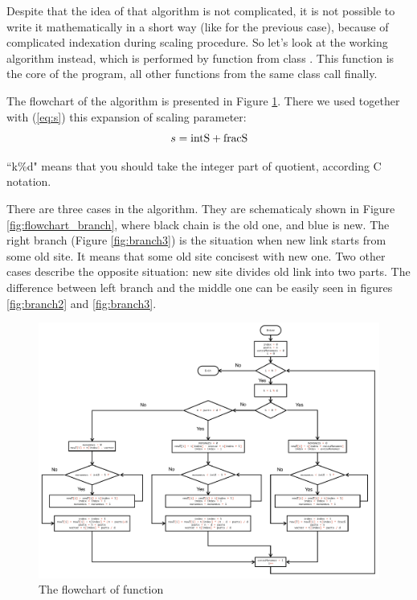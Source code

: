 \documentclass[12pt]{article}
\begin{document}
\begin{mySection}[Algorithm]
Despite that the idea of that algorithm is not complicated, it is not possible to write it mathematically in a short way (like for the previous case), because of complicated indexation during scaling procedure. So let's look at the working algorithm instead, which is performed by function  from class . This function is the core of the program, all other functions from the same class call  finally.

The flowchart of the algorithm is presented in Figure \ref{fig:flowchart}. There we used together with (\ref{eq:s}) this expansion of scaling parameter:
\begin{equation}
s = {\rm intS} +{\rm fracS} 
\end{equation}

``k\%d" means that you should take the integer part of quotient, according C notation.

There are three cases in the algorithm. They are schematicaly shown in Figure \ref{fig:flowchart_branch}, where black chain is the old one, and blue is new. The right branch (Figure \ref{fig:branch3}) is the situation when new link starts from some old site. It means that some old site concisest with new one. Two other cases describe the opposite situation: new site divides old link into two parts. The difference between left branch and the middle one can be easily seen  in figures \ref{fig:branch2} and \ref{fig:branch3}.

\begin{figure}[t]
	\centering
	\vskip -0cm 
  	\includegraphics[width=1.0\linewidth]{Flowchart.pdf}
  	\caption{The flowchart of function }
	\label{fig:flowchart}
\end{figure}


\end{mySection}
\end{document}
